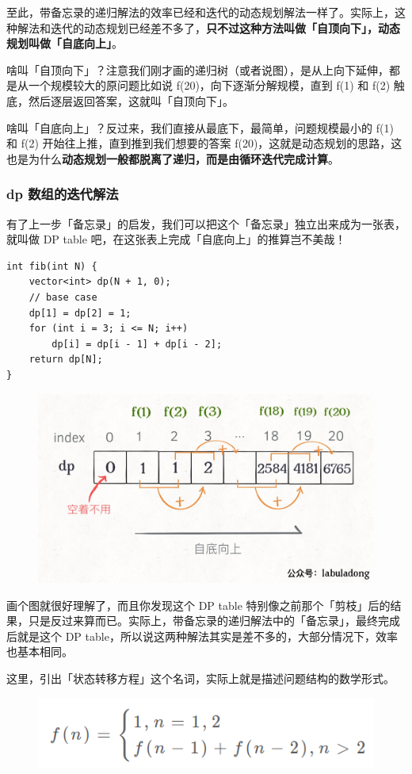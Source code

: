 \documentclass[12pt]{article}
\begin{document}
至此，带备忘录的递归解法的效率已经和迭代的动态规划解法一样了。实际上，这种解法和迭代的动态规划已经差不多了，\textbf{只不过这种方法叫做「自顶向下」，动态规划叫做「自底向上」}。

啥叫「自顶向下」？注意我们刚才画的递归树（或者说图），是从上向下延伸，都是从一个规模较大的原问题比如说 f(20)，向下逐渐分解规模，直到 f(1) 和 f(2) 触底，然后逐层返回答案，这就叫「自顶向下」。

啥叫「自底向上」？反过来，我们直接从最底下，最简单，问题规模最小的 f(1) 和 f(2) 开始往上推，直到推到我们想要的答案 f(20)，这就是动态规划的思路，这也是为什么\textbf{动态规划一般都脱离了递归，而是由循环迭代完成计算}。

\subsubsection{dp 数组的迭代解法}
有了上一步「备忘录」的启发，我们可以把这个「备忘录」独立出来成为一张表，就叫做 DP table 吧，在这张表上完成「自底向上」的推算岂不美哉！
\begin{lstlisting}
int fib(int N) {
    vector<int> dp(N + 1, 0);
    // base case
    dp[1] = dp[2] = 1;
    for (int i = 3; i <= N; i++)
        dp[i] = dp[i - 1] + dp[i - 2];
    return dp[N];
}
\end{lstlisting}
\begin{figure}[H]
    \centering
    \includegraphics[width=.5\textwidth]{fig/Dynamic_Programming_Recursion_Tree_4.jpg}
\end{figure}

画个图就很好理解了，而且你发现这个 DP table 特别像之前那个「剪枝」后的结果，只是反过来算而已。实际上，带备忘录的递归解法中的「备忘录」，最终完成后就是这个 DP table，所以说这两种解法其实是差不多的，大部分情况下，效率也基本相同。

这里，引出「状态转移方程」这个名词，实际上就是描述问题结构的数学形式。
\begin{figure}[H]
    \centering
    \includegraphics[width=.5\textwidth]{fig/Dynamic_Programming_Status_Transition.png}
\end{figure}
\end{document}
